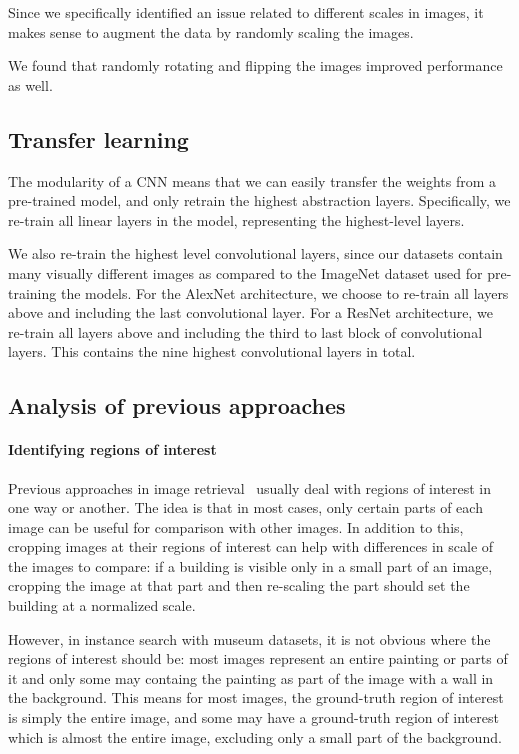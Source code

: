 Since we specifically identified an issue related to different scales
in images, it makes sense to augment the data by randomly scaling the
images. %

We found that randomly rotating and flipping the images improved performance
as well.

\subsection{Transfer learning}
The modularity of a CNN means that we can easily transfer
the weights from a pre-trained model, and only retrain the highest
abstraction layers. Specifically, we re-train all linear layers in the
model, representing the highest-level layers.

We also re-train the highest level convolutional layers, since our datasets
contain many visually different images as compared to the ImageNet
dataset used for pre-training the models.
For the AlexNet architecture, we choose to re-train all layers above
and including the last convolutional layer.
For a ResNet architecture, we re-train all layers above and including the
third to last block of convolutional layers. This contains the
nine highest convolutional layers in total.

\subsection{Analysis of previous approaches}\label{sec:analysisprev}
\paragraph{Identifying regions of interest}
Previous approaches in image retrieval~\cite{}%
usually deal with regions of interest in one way or another.
The idea is that in most cases, only certain parts of each image can
be useful for comparison with other images. In addition to this,
cropping images at their regions of interest can help with differences
in scale of the images to compare: if a building is visible only in a small
part of an image, cropping the image at that part and then re-scaling
the part should set the building at a normalized scale.

However, in instance search with museum datasets, it is not obvious
where the regions of interest should be: most images represent an entire
painting or parts of it and only some may containg the painting as part
of the image with a wall in the background. This means for most images,
the ground-truth region of interest is simply the entire image, and some
may have a ground-truth region of interest which is almost the entire image,
excluding only a small part of the background.

